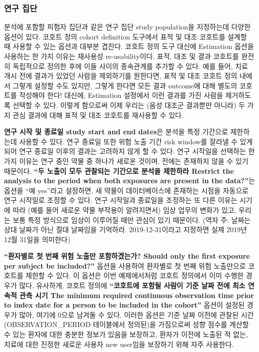 \documentclass[10.5pt]{book}
\theoremstyle{definition}
\theoremstyle{definition}
\theoremstyle{definition}
\theoremstyle{remark}
\begin{document}
\subsubsection*{연구 집단}\label{-}

분석에 포함할 피험자 집단과 같은 연구 집단 study population을 지정하는데
다양한 옵션이 있다. 코호트 정의 cohort definition 도구에서 표적 및 대조
코호트를 설계할 때 사용할 수 있는 옵션과 대부분 겹친다. 코호트 정의 도구
대신에 Estimation 옵션을 사용하는 한 가지 이유는 재사용성
re-usability이다. 표적, 대조 및 결과 코호트를 완전히 독립적으로 정의한
후에 이들 사이의 종속관계를 추가할 수 있다. 예를 들어, 치료 개시 전에
결과가 있었던 사람을 제외하기를 원한다면, 표적 및 대조 코호트 정의
내에서 그렇게 설정할 수도 있지만, 그렇게 한다면 모든 결과 outcome에 대해
별도의 코호트를 작성해야 한다! 대신에, Estimation 설정에서 이런 결과를
가진 사람을 제거하도록 선택할 수 있다. 이렇게 함으로써 이제 우리는 (음성
대조군 결과뿐만 아니라) 두 가지 관심 결과에 대해 표적 및 대조 코호트를
재사용할 수 있다.

\textbf{연구 시작 및 종료일 study start and end dates}은 분석을 특정
기간으로 제한하는데 사용할 수 있다. 연구 종료일 또한 위험 노출 기간 risk
window를 잘라낼 수 있게 되어 연구 종료일 이후의 결과는 고려하지 않게 할
수 있다. 연구 시작일을 선택하는 한 가지 이유는 연구 중인 약물 중 하나가
새로운 것이며, 전에는 존재하지 않을 수 있기 때문이다. \textbf{``두
노출이 모두 관찰되는 기간으로 분석을 제한하라 Restrict the analysis to
the period when both exposures are present in the data?''}는 옵션을 ``예
yes''라고 설정하면, 새 약물이 데이터베이스에 존재하는 시점을 자동으로
연구 시작일로 조정할 수 있다. 연구 시작일과 종료일을 조정하는 또 다른
이유는 시기에 따라 (예를 들어 새로운 약물 부작용이 알려지면서) 임상
업무의 변화가 있고, 우리는 보통 특정 방식으로 임상이 이루어질 때만
관심이 있기 때문이다. (역자 주: 날짜는 상대 날짜가 아닌 절대 날짜임을
기억하라. 2019-12-31이라고 지정하면 실제 2019년 12월 31일을 의미한다)

\textbf{``환자별로 첫 번째 위험 노출만 포함하겠는가? Should only the
first exposure per subject be included?''} 옵션을 사용하여 환자별로 첫
번째 위험 노출만으로 코호트를 제한할 수 있다. 이 옵션은 이번
예제에서처럼 코호트 정의에서 이미 수행한 경우가 많다. 유사하게, 코호트
정의에 \textbf{``코호트에 포함될 사람이 기준 날짜 전에 최소 연속적 관측
시기 The minimum required continuous observation time prior to index
date for a person to be included in the cohort''} 옵션이 설정된 경우가
많아, 여기에 0으로 남겨둘 수 있다. 이러한 옵션은 기준 날짜 이전에 관찰된
시간 (OBSERVATION\_PERIOD 테이블에서 정의된)을 가짐으로써 성향 점수를
계산할 수 있는 환자에 대한 충분한 정보가 있음을 보장하고, 환자가 이전에
노출된 적 없는, 치료에 대한 진정한 새로운 사용자 new user임을 보장하기
위해 자주 사용한다.
\end{document}
